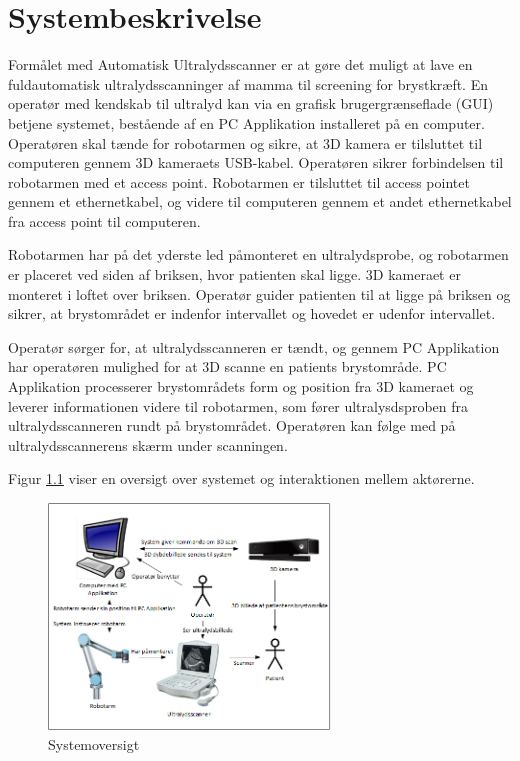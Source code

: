 \chapter{Systembeskrivelse}\label{Systembeskrivelse}
Formålet med Automatisk Ultralydsscanner er at gøre det muligt at lave en fuldautomatisk ultralydsscanninger af mamma til screening for brystkræft. En operatør med kendskab til ultralyd kan via en grafisk brugergrænseflade (GUI) betjene systemet, bestående af en PC Applikation installeret på en computer. Operatøren skal tænde for robotarmen og sikre, at 3D kamera er tilsluttet til computeren gennem 3D kameraets USB-kabel. Operatøren sikrer forbindelsen til robotarmen med et access point. Robotarmen er tilsluttet til access pointet gennem et ethernetkabel, og videre til computeren gennem et andet ethernetkabel fra access point til computeren.  

Robotarmen har på det yderste led påmonteret en ultralydsprobe, og robotarmen er placeret ved siden af briksen, hvor patienten skal ligge. 3D kameraet er monteret i loftet over briksen. Operatør guider patienten til at ligge på briksen og sikrer, at  brystområdet er indenfor intervallet og hovedet er udenfor intervallet. 

Operatør sørger for, at ultralydsscanneren er tændt, og gennem PC Applikation har operatøren mulighed for at 3D scanne en patients brystområde. PC Applikation processerer brystområdets form og position fra 3D kameraet og leverer informationen videre til robotarmen, som fører ultralysdsproben fra ultralydsscanneren rundt på brystområdet.  Operatøren kan følge med på ultralydsscannerens skærm under scanningen. 

Figur \ref{Systembeskrivelse} viser en oversigt over systemet og interaktionen mellem aktørerne. 

\begin{figure}[H]
    \centering
    \includegraphics[width=0.67\textwidth]{figurer/d/Kravspecifikation/Systembeskrivelse}
    \caption{Systemoversigt}
    \label{Systembeskrivelse}
\end{figure}
\pagebreak
